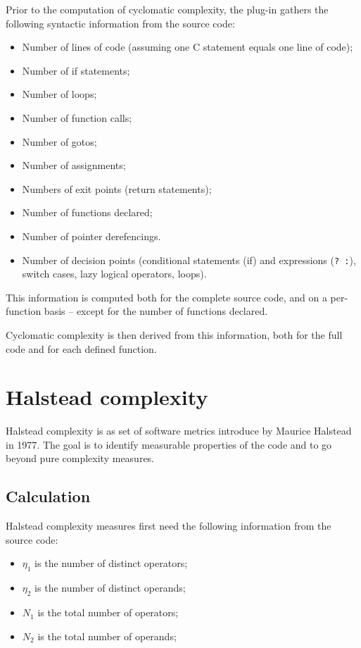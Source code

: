 \documentclass{frama-c-book}
\begin{document}
Prior to the computation of cyclomatic complexity, the plug-in gathers the
following syntactic information from the source code:
\begin{itemize}

\item Number of lines of code (assuming one C statement equals one line of code);
\item Number of if statements;
\item Number of loops;
\item Number of function calls;
\item Number of gotos;
\item Number of assignments;
\item Numbers of exit points (return statements);
\item Number of functions declared;
\item Number of pointer derefencings.
\item Number of decision points (conditional statements (if) and expressions
  (\verb|? :|), switch cases,
  lazy logical operators, loops).
\end{itemize}

This information is computed both for the complete source code, and
on a per-function basis -- except for the number of functions
declared.

Cyclomatic complexity is then derived from this information, both for the
full code and for each defined function.

\section{Halstead complexity}
\label{sec:halstead-complexity}
Halstead complexity is as set of software metrics introduce by Maurice Halstead
\cite{HalsteadComplexity} in 1977. The goal is to identify measurable properties
of the code and to go beyond pure complexity measures.

\subsection{Calculation}
\label{sec:halstead_computation}

Halstead complexity measures first need the following information from the
source code:
\begin{itemize}
\item $\eta_{1}$ is the number of distinct operators;
\item $\eta_{2}$ is the number of distinct operands;
\item $N_{1}$ is the total number of operators;
\item $N_{2}$ is the total number of operands;
\end{itemize}
\end{document}
